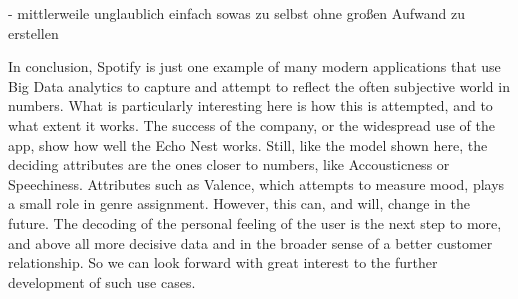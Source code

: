         - mittlerweile unglaublich einfach sowas zu selbst ohne großen Aufwand zu erstellen

        In conclusion, Spotify is just one example of many modern applications that use Big Data analytics to capture and attempt to reflect the often subjective world in numbers. 
        What is particularly interesting here is how this is attempted, and to what extent it works. The success of the company, or the widespread use of the app, 
        show how well the Echo Nest works. Still, like the model shown here, the deciding attributes are the ones closer to numbers, like Accousticness or Speechiness. 
        Attributes such as Valence, which attempts to measure mood, plays a small role in genre assignment. However, this can, and will, change in the future. 
        The decoding of the personal feeling of the user is the next step to more, and above all more decisive data and in the broader sense of a better customer relationship. 
        So we can look forward with great interest to the further development of such use cases.


